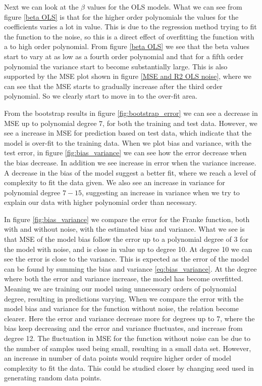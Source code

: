 \noindent Next we can look at the $\beta$ values for the OLS models. What we can see from figure \eqref{beta OLS} is that for the higher order polynomials the values for the coefficients varies a lot in value. This is due to the regression method trying to fit the function to the noise, so this is a direct effect of overfitting the function with a to high order polynomial. From figure \eqref{beta OLS} we see that the beta values start to vary at as low as a fourth order polynomial and that for a fifth order polynomial the variance start to become substantially large. This is also supported by the MSE plot shown in figure \eqref{MSE and R2 OLS noise}, where we can
see that the MSE starts to gradually increase after the third order polynomial. So we clearly start to move in to the over-fit area. 

\noindent From the bootstrap results in figure \ref{fig:bootstrap_error} we can see a decrease in MSE up to polynomial degree $7$, for both the training and test data. However, we see a increase in MSE for prediction based on test data, which indicate that the model is over-fit to the training data. When we plot bias and variance, with the test error, in figure \ref{fig:bias_variance} we can see how the error decrease when the bias decrease. In addition we see increase in error when the variance increase. A decrease in the bias of the model suggest a better fit, where we reach a level of complexity to fit the data given. We also see an increase in variance for polynomial degree $7-15$, suggesting an increase in variance when we try to explain our data with higher polynomial order than necessary.

\noindent In figure \ref{fig:bias_variance} we compare the error for the Franke function, both with and without noise, with the estimated bias and variance. What we see is that MSE of the model bias follow the error up to a polynomial degree of 3 for the model with noise, and is close in value up to degree 10. At degree 10 we can see the error is close to the variance. This is expected as the error of the model can be found by summing the bias and variance \eqref{eq:bias_variance}. At the degree where both the error and variance increase, the model has become overfitted. Meaning we are training our model using unnecessary orders of polynomial degree, resulting in predictions varying. When we compare the error with the model bias and variance for the function without noise, the relation become clearer. Here the error and variance decrease more for degrees up to 7, where the bias keep decreasing and the error and variance fluctuates, and increase from degree 12. The fluctuation in MSE for the function without noise can be due to the number of samples used being small, resulting in a small data set. However, an increase in number of data points would require higher order of model complexity to fit the data. This could be studied closer by changing seed used in generating random data points.

